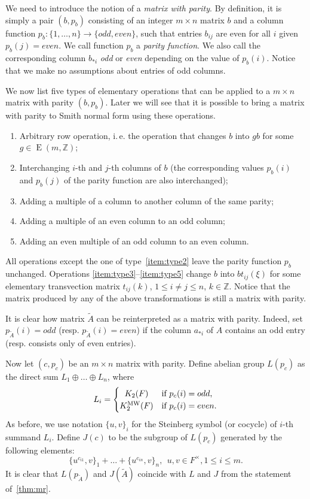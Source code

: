 \documentclass[oneside, 10pt]{amsart}
\theoremstyle{plain}
\theoremstyle{remark}
\theoremstyle{definition}
\DeclareMathOperator{\E}{E}
\newcommand{\ZZ}{\mathbb{Z}}
\newcommand{\K}{K_2}
\newcommand{\Kmw}{K^{\mathrm{MW}}_2}
\begin{document}
We need to introduce the notion of a {\it matrix with parity}.
By definition, it is simply a pair $(b, p_b)$ consisting of an integer $m\times n$ matrix $b$ and a column function $p_b\colon \{1,\ldots,n\}\to \{odd, even\}$,
 such that entries $b_{ij}$ are even for all $i$ given $p_b(j)=even$.
We call function $p_b$ a {\it parity function}.
We also call the corresponding column $b_{*i}$ {\it odd} or {\it even} depending on the value of $p_b(i)$.
Notice that we make no assumptions about entries of odd columns.

We now list five types of elementary operations that can be applied to a $m \times n$ matrix with parity $(b, p_b)$.
Later we will see that it is possible to bring a matrix with parity to Smith normal form using these operations.
\begin{enumerate}
 \item \label{item:type1} Arbitrary row operation, i.\,e. the operation that changes $b$ into $gb$ for some $g \in \E(m, \ZZ)$;
 \item \label{item:type2} Interchanging $i$-th and $j$-th columns of $b$ 
  (the corresponding values $p_b(i)$ and $p_b(j)$ of the parity function are also interchanged);
 \item \label{item:type3} Adding a multiple of a column to another column of the same parity;
 \item \label{item:type4} Adding a multiple of an even column to an odd column;
 \item \label{item:type5} Adding an even multiple of an odd column to an even column.
\end{enumerate}
All operations except the one of type~\eqref{item:type2} leave the parity function $p_b$ unchanged.
Operations \eqref{item:type3}--\eqref{item:type5} change $b$ into $bt_{ij}(\xi)$
 for some elementary transvection matrix $t_{ij}(k)$, $1\leq i\neq j\leq n$, $k \in \ZZ$.
Notice that the matrix produced by any of the above transformations is still a matrix with parity.

It is clear how matrix $\widetilde{A}$ can be reinterpreted as a matrix with parity.
Indeed, set $p_{\widetilde{A}}(i) = odd$ (resp. $p_{\widetilde{A}}(i) = even$) if the column $a_{*i}$ of
 $A$ contains an odd entry (resp. consists only of even entries).

Now let $(c, p_c)$ be an $m\times n$ matrix with parity.
Define abelian group $L(p_c)$ as the direct sum $L_1 \oplus \ldots \oplus L_n$, where 
\[L_i=\left\{\def\arraystretch{1.2}%
  \begin{array}{@{}c@{\quad}l@{}}
     \K(F) & \text{if $p_c(i) = odd$,} \\    
     \Kmw(F) & \text{if $p_c(i) = even$}.
  \end{array}\right.\]
As before, we use notation $\{u, v\}_i$ for the Steinberg symbol (or cocycle) of $i$-th summand $L_i$.
Define $J(c)$ to be the subgroup of $L(p_c)$ generated by the following elements:
\[ \{ u^{c_{i1}}, v\}_1 + \ldots + \{u^{c_{in}}, v\}_{n},\ \ u, v\in F^\times, 1\leq i \leq m.\]
It is clear that $L(p_{\widetilde{A}})$ and $J({\widetilde{A}})$ coincide with $L$ and $J$ from the statement of~\cref{thm:mr}.
\end{document}
